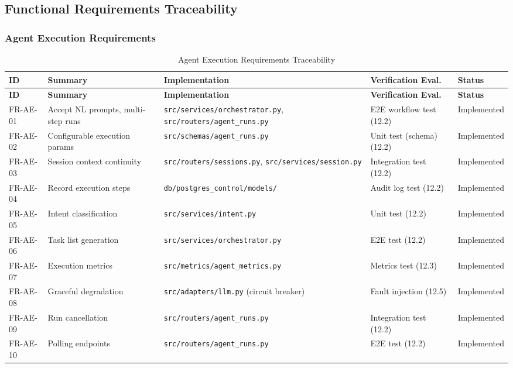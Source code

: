 \subsection{Functional Requirements Traceability}
\label{subsec:fr-traceability}

\subsubsection{Agent Execution Requirements}

\begin{longtable}{|>{\raggedright\arraybackslash}p{1.4cm}|>{\raggedright\arraybackslash}p{2.5cm}|>{\raggedright\arraybackslash}p{3cm}|>{\raggedright\arraybackslash}p{3cm}|>{\raggedright\arraybackslash}p{1.5cm}|}
\caption{Agent Execution Requirements Traceability} \label{tab:trace-agent} \\
\hline
\textbf{ID} & \textbf{Summary} & \textbf{Implementation} & \textbf{Verification Eval.} & \textbf{Status} \\
\hline
\endfirsthead
\hline
\textbf{ID} & \textbf{Summary} & \textbf{Implementation} & \textbf{Verification Eval.} & \textbf{Status} \\
\hline
\endhead
\hline
\endfoot
FR-AE-01 & Accept NL prompts, multi-step runs & \texttt{src/services/orchestrator.py}, \texttt{src/routers/agent\_runs.py} & E2E workflow test (12.2) & Implemented \\
\hline
FR-AE-02 & Configurable execution params & \texttt{src/schemas/agent\_runs.py} & Unit test (schema) (12.2) & Implemented \\
\hline
FR-AE-03 & Session context continuity & \texttt{src/routers/sessions.py}, \texttt{src/services/session.py} & Integration test (12.2) & Implemented \\
\hline
FR-AE-04 & Record execution steps & \texttt{db/postgres\_control/models/} & Audit log test (12.2) & Implemented \\
\hline
FR-AE-05 & Intent classification & \texttt{src/services/intent.py} & Unit test (12.2) & Implemented \\
\hline
FR-AE-06 & Task list generation & \texttt{src/services/orchestrator.py} & E2E test (12.2) & Implemented \\
\hline
FR-AE-07 & Execution metrics & \texttt{src/metrics/agent\_metrics.py} & Metrics test (12.3) & Implemented \\
\hline
FR-AE-08 & Graceful degradation & \texttt{src/adapters/llm.py} (circuit breaker) & Fault injection (12.5) & Implemented \\
\hline
FR-AE-09 & Run cancellation & \texttt{src/routers/agent\_runs.py} & Integration test (12.2) & Implemented \\
\hline
FR-AE-10 & Polling endpoints & \texttt{src/routers/agent\_runs.py} & E2E test (12.2) & Implemented \\
\hline
\end{longtable}

